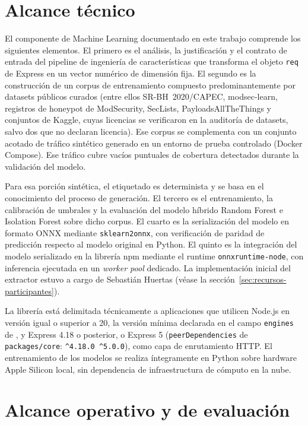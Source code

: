 \section{Alcance técnico}

El componente de Machine Learning documentado en este trabajo comprende los siguientes elementos. El primero es el análisis, la justificación y el contrato de entrada del pipeline de ingeniería de características que transforma el objeto \texttt{req} de Express en un vector numérico de dimensión fija. El segundo es la construcción de un corpus de entrenamiento compuesto predominantemente por datasets públicos curados (entre ellos SR-BH~2020/CAPEC, modsec-learn, registros de honeypot de ModSecurity, SecLists, PayloadsAllTheThings y conjuntos de Kaggle, cuyas licencias se verificaron en la auditoría de datasets, salvo dos que no declaran licencia). Ese corpus se complementa con un conjunto acotado de tráfico sintético generado en un entorno de prueba controlado (Docker Compose). Ese tráfico cubre vacíos puntuales de cobertura detectados durante la validación del modelo.

Para esa porción sintética, el etiquetado es determinista y se basa en el conocimiento del proceso de generación. El tercero es el entrenamiento, la calibración de umbrales y la evaluación del modelo híbrido Random Forest e Isolation Forest sobre dicho corpus. El cuarto es la serialización del modelo en formato ONNX mediante \texttt{sklearn2onnx}, con verificación de paridad de predicción respecto al modelo original en Python. El quinto es la integración del modelo serializado en la librería npm mediante el runtime \texttt{onnxruntime-node}, con inferencia ejecutada en un \textit{worker pool} dedicado. La implementación inicial del extractor estuvo a cargo de Sebastián Huertas (véase la sección~\ref{sec:recursos-participantes}).

La librería está delimitada técnicamente a aplicaciones que utilicen Node.js en versión igual o superior a 20, la versión mínima declarada en el campo \texttt{engines} de , y Express 4.18 o posterior, o Express 5 (\texttt{peerDependencies} de \texttt{packages/core}: \texttt{\textasciicircum 4.18.0 \textbar\textbar{} \textasciicircum 5.0.0}), como capa de enrutamiento HTTP. El entrenamiento de los modelos se realiza íntegramente en Python sobre hardware Apple Silicon local, sin dependencia de infraestructura de cómputo en la nube.

\section{Alcance operativo y de evaluación}

